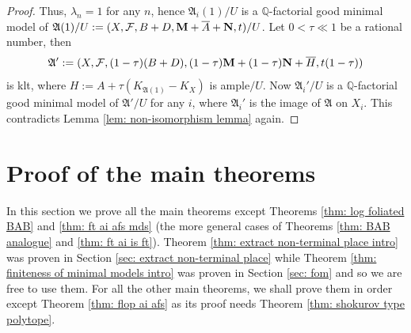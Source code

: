 \documentclass[12pt]{amsart}
\numberwithin{equation}{section}
\newcommand{\Mm}{{\bf{M}}}
\newcommand{\Nn}{{\bf{N}}}
\newcommand{\Aa}{{\mathfrak{A}}}
\newcommand{\Ff}{\mathcal{F}}
\theoremstyle{definition}
\theoremstyle{definition}
\theoremstyle{definition}
\begin{document}
\begin{proof}
    Thus, $\lambda_n=1$ for any $n$, hence $\Aa_i(1)/U$ is a $\mathbb Q$-factorial good minimal model of $\Aa(1)/U:=(X,\Ff,B+D,\Mm+\overline{A}+\Nn,t)/U$. Let $0<\tau\ll 1$ be a rational number, then
    $$\Aa':=(X,\Ff,(1-\tau)(B+D),(1-\tau)\Mm+(1-\tau)\Nn+\overline{H},t(1-\tau))$$
    is klt, where $H:=A+\tau(K_{\Aa(1)}-K_X)$ is ample$/U$. Now $\Aa_i'/U$ is a $\mathbb Q$-factorial good minimal model of $\Aa'/U$ for any $i$, where $\Aa_i'$ is the image of $\Aa$ on $X_i$. This contradicts Lemma \ref{lem: non-isomorphism lemma} again.
 \end{proof}


\section{Proof of the main theorems}\label{sec: proof of the main theorems}

In this section we prove all the main theorems except Theorems \ref{thm: log foliated BAB} and \ref{thm: ft ai afs mds} (the more general cases of Theorems \ref{thm: BAB analogue} and \ref{thm: ft ai is ft}). Theorem \ref{thm: extract non-terminal place intro} was proven in Section \ref{sec: extract non-terminal place} while Theorem \ref{thm: finiteness of minimal models intro} was proven in Section \ref{sec: fom} and so we  are free to use them. For all the other main theorems, we shall prove them in order except Theorem \ref{thm: flop ai afs} as its proof needs Theorem \ref{thm: shokurov type polytope}.
\end{document}
